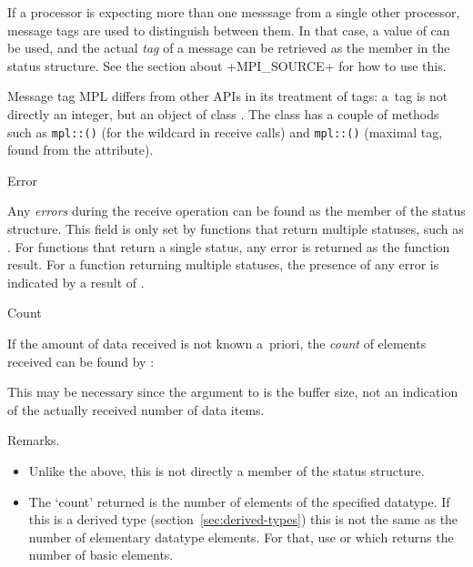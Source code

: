 If a processor is expecting more than one messsage from a single other processor,
message tags are used to distinguish between them. In that case,
a value of  can be used, and the actual
\emph{tag}
of a message can be retrieved as the
%
%
member in the status structure. See the section about \clstinline+MPI_SOURCE+
for how to use this.

\begin{mplnote}{Message tag}
  \ac{MPL} differs from other \acp{API} in its treatment of tags:
  a~tag is not directly an integer, but an object of class .
  The  class has a couple of methods such as
  \lstinline+mpl::+\lstinline+()+
  (for the  wildcard in receive calls)
  and
  \lstinline+mpl::+\lstinline+()+
  (maximal tag, found from the  attribute).
\end{mplnote}

 {Error}
\label{sec:mpi-status-error}

Any \emph{errors}
during the receive operation can be found as the
member of the status structure.
This field is only set by functions that return multiple statuses,
such as .
For functions that return a single status, any error is returned
as the function result.
For a function returning multiple statuses, the presence of any error
is indicated by a result of .

 {Count}
\label{sec:mpi-status-count}

If the amount of data received is not known a~priori, the
\emph{count} of elements received
can be found by 
:

This may be necessary since the  argument to  is 
the buffer size, not an indication of the actually received number of
data items.

Remarks.
\begin{itemize}
\item Unlike the above, this is not directly a member of the status
  structure.
\item The `count' returned is the number of elements of the specified
  datatype. If this is a derived type
  (section~\ref{sec:derived-types}) this is not the same as the number
  of elementary datatype elements. For that, use
   or
  which returns the number of basic elements.
\end{itemize}

